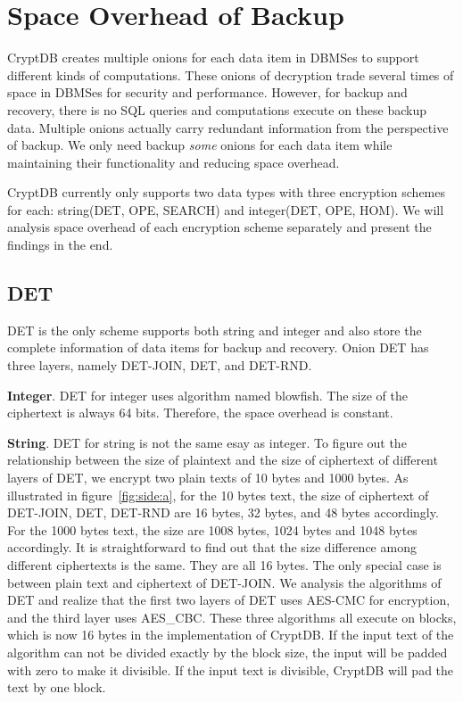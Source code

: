 \section{Space Overhead of Backup}

CryptDB creates multiple onions for each data item in DBMSes to support different kinds of computations. These onions of decryption trade several times of space in DBMSes for security and performance. However, for backup and recovery, there is no SQL queries and computations execute on these backup data. Multiple onions actually carry redundant information from the perspective of backup. We only need backup \textit{some} onions for each data item while maintaining their functionality and reducing space overhead. 

CryptDB currently only supports two data types with three encryption schemes for each: string(DET, OPE, SEARCH) and integer(DET, OPE, HOM). We will analysis space overhead of each encryption scheme separately and present the findings in the end.

\subsection{DET}
DET is the only scheme supports both string and integer and also store the complete information of data items for backup and recovery. Onion DET has three layers, namely DET-JOIN, DET, and DET-RND. 

\textbf{Integer}. DET for integer uses algorithm named blowfish. The size of the ciphertext is always 64 bits. Therefore, the space overhead is constant.

\textbf{String}. DET for string is not the same esay as integer. To figure out the relationship between the size of plaintext and the size of ciphertext of different layers of DET, we encrypt two plain texts of 10 bytes and 1000 bytes. As illustrated in figure~\ref{fig:side:a},  for the 10 bytes text, the size of ciphertext of DET-JOIN, DET, DET-RND are 16 bytes, 32 bytes, and 48 bytes accordingly. For the 1000 bytes text, the size are 1008 bytes, 1024 bytes and 1048 bytes accordingly. It is straightforward to find out that the size difference among different ciphertexts is the same. They are all 16 bytes. The only special case is between plain text and ciphertext of DET-JOIN. We analysis the algorithms of DET and realize that the first two layers of DET uses AES-CMC for encryption, and the third layer uses AES\_CBC. These three algorithms all execute on blocks, which is now 16 bytes in the implementation of CryptDB. If the input text of the algorithm can not be divided exactly by the block size, the input will be padded with zero to make it divisible. If the input text is divisible, CryptDB will pad the text by one block. 

